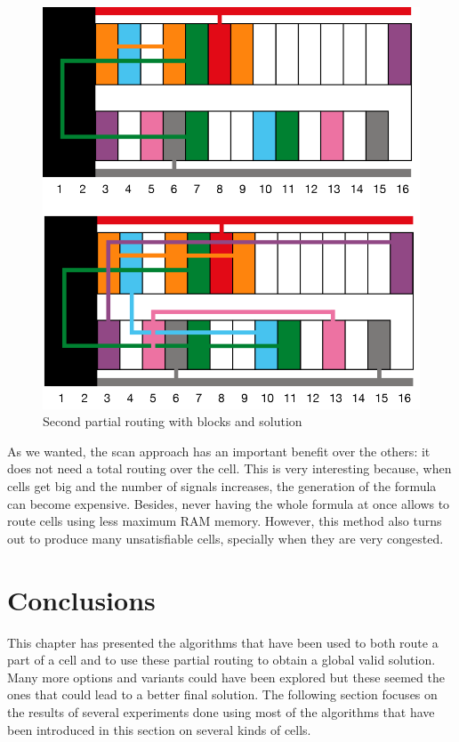 \begin{figure}[h!]
  \centering
  \includegraphics[scale=0.5]{img/design/scanalt.png}
  \caption{Second partial routing with blocks and solution}
  \label{fig:scanalt}
\end{figure} 

As we wanted, the scan approach has an important benefit over the others: it does not need a total routing over the cell. This is very interesting because, when cells get big and the number of signals increases, the generation of the formula can become expensive. Besides, never having the whole formula at once allows to route cells using less maximum RAM memory. However, this method also turns out to produce many unsatisfiable cells, specially when they are very congested. \\


\section{Conclusions}

This chapter has presented the algorithms that have been used to both route a part of a cell and to use these partial routing to obtain a global valid solution. Many more options and variants could have been explored but these seemed the ones that could lead to a better final solution. The following section focuses on the results of several experiments done using most of the algorithms that have been introduced in this section on several kinds of cells.